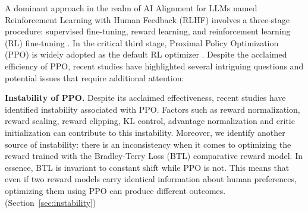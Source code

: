 \documentclass{article} %
\begin{document}
A dominant approach in the realm of AI Alignment for LLMs named Reinforcement Learning with Human Feedback (RLHF) involves a three-stage procedure: supervised fine-tuning, reward learning, and reinforcement learning (RL) fine-tuning \citep{ziegler2019fine,ouyang2022training}. In the critical third stage, Proximal Policy Optimization (PPO) is widely adopted as the default RL optimizer \citep{schulman2017proximal}. Despite the acclaimed efficiency of PPO, recent studies have highlighted several intriguing questions and potential issues that require additional attention:

\textbf{Instability of PPO.} Despite its acclaimed effectiveness, recent studies have identified instability associated with PPO. Factors such as reward normalization, reward scaling, reward clipping, KL control, advantage normalization and critic initialization \citep{zheng2023secrets,engstrom2020implementation} can contribute to this instability. 
Moreover, we identify another source of instability:
there is an inconsistency when it comes to optimizing the reward trained with the Bradley-Terry Loss (BTL) comparative reward model. In essence, BTL is invariant to constant shift while PPO is not. This means that even if two reward models carry identical information about human preferences, optimizing them using PPO can produce different outcomes. (Section~\ref{sec:instability})
\end{document}
